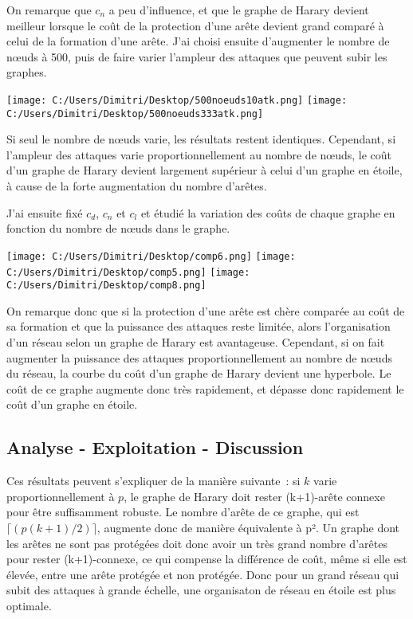 \documentclass[12pt,a4paper]{article}
\begin{document}
On remarque que $c_{n}$ a peu d'influence, et que le graphe de Harary devient meilleur lorsque le coût de la protection d'une arête devient grand comparé à celui de la formation d'une arête.
J'ai choisi ensuite d'augmenter le nombre de nœuds à 500, puis de faire varier l'ampleur des attaques que peuvent subir les graphes.

\begin{center}
\texttt{[image: C:/Users/Dimitri/Desktop/500noeuds10atk.png]}
\texttt{[image: C:/Users/Dimitri/Desktop/500noeuds333atk.png]}
\end{center}

Si seul le nombre de nœuds varie, les résultats restent identiques. Cependant, si l'ampleur des attaques varie proportionnellement au nombre de nœuds, le coût d'un graphe de Harary devient largement supérieur à celui d'un graphe en étoile, à cause de la forte augmentation du nombre d'arêtes.

J'ai ensuite fixé $c_{d}$, $c_{n}$ et $c_{l}$ et étudié la variation des coûts de chaque graphe en fonction du nombre de nœuds dans le graphe.

\begin{center}
\texttt{[image: C:/Users/Dimitri/Desktop/comp6.png]}
\texttt{[image: C:/Users/Dimitri/Desktop/comp5.png]}
\texttt{[image: C:/Users/Dimitri/Desktop/comp8.png]}
\end{center}

On remarque donc que si la protection d'une arête est chère comparée au coût de sa formation et que la puissance des attaques reste limitée, alors l'organisation d'un réseau selon un graphe de Harary est   avantageuse. Cependant, si on fait augmenter la puissance des attaques proportionnellement au nombre de nœuds du réseau, la courbe du coût d'un graphe de Harary devient une hyperbole. Le coût de ce graphe augmente donc très rapidement, et dépasse donc rapidement le coût d'un graphe en étoile.

\subsection{Analyse - Exploitation - Discussion}
Ces résultats peuvent s'expliquer de la manière suivante : si $k$ varie proportionnellement à $p$, le graphe de Harary doit rester (k+1)-arête connexe pour être suffisamment robuste. Le nombre d'arête de ce graphe, qui est $\lceil (p(k+1)/2) \rceil$, augmente donc de manière équivalente à  p². Un graphe dont les arêtes ne sont pas protégées doit donc avoir un très grand nombre d'arêtes pour rester (k+1)-connexe, ce qui compense la différence de coût, même si elle est élevée, entre une arête protégée et non protégée. Donc pour un grand réseau qui subit des attaques à grande échelle, une organisaton de réseau en étoile est plus optimale.
\end{document}
